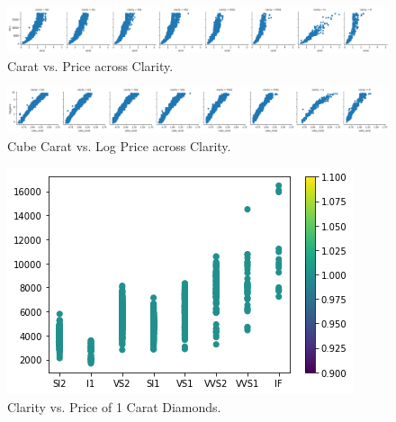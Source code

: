 \begin{figure}
	\includegraphics[width=\textwidth,height=\textheight,keepaspectratio]{images/figure59.png}
	\caption{Carat vs. Price across Clarity.}\label{fig:figure59}
\end{figure}

\begin{figure}
	\includegraphics[width=\textwidth,height=\textheight,keepaspectratio]{images/figure60.png}
	\caption{Cube Carat vs. Log Price across Clarity.}\label{fig:figure60}
\end{figure}

\begin{figure}
	\includegraphics[width=\textwidth,height=\textheight,keepaspectratio]{images/figure61.png}
	\caption{Clarity vs. Price of 1 Carat Diamonds.}\label{fig:figure61}
\end{figure}